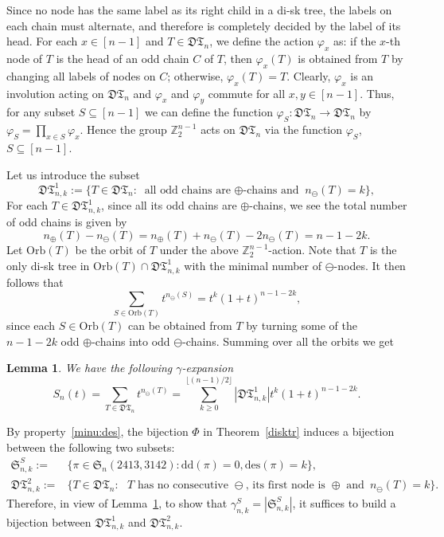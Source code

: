 \documentclass[12pt]{amsart}
\numberwithin{equation}{section}
\theoremstyle{plain}
\newtheorem{lemma}[theorem]{Lemma}
\theoremstyle{definition}
\newcommand{\Z}{\mathbb{Z}}
\def\dd{\mathrm{dd}}
\def\des{\mathrm{des}}
\def\S{\mathfrak{S}}
\def\D{\mathfrak{D}}
\def\T{\mathfrak{T}}
\def\Orb{\mathrm{Orb}}
\begin{document}
Since no node has the same label as its right child in a di-sk tree, the labels on each chain must alternate, and therefore is completely decided by the label of its head. For each $x\in[n-1]$ and $T\in\D\T_n$, we define the action $\varphi_x$ as: if the $x$-th node of $T$ is the head of an odd chain $C$ of $T$, then   $\varphi_x(T)$ is obtained from $T$ by changing all labels of nodes on $C$; otherwise, $\varphi_x(T)=T$. Clearly, $\varphi_x$ is an involution acting on $\D\T_n$ and $\varphi_x$ and $\varphi_y$ commute for all $x,y\in[n-1]$. Thus, for any subset $S\subseteq[n-1]$ we can define the function $\varphi_S:\D\T_n\rightarrow\D\T_n$ by $\varphi_S=\prod_{x\in S}\varphi_x$.  Hence the group $\Z_2^{n-1}$ acts on $\D\T_n$ via the function $\varphi_S$, $S\subseteq[n-1]$. 

Let us introduce the subset 
$$
\D\T_{n,k}^{1}:=\{T\in\D\T_n :  \text{ all odd chains are $\oplus$-chains and }n_\ominus(T)=k\},
$$
For each $T\in\D\T_{n,k}^{1}$, since all its odd chains are $\oplus$-chains, we see the total number of odd chains is given by
$$n_\oplus(T)-n_\ominus(T)=n_\oplus(T)+n_\ominus(T)-2n_\ominus(T)=n-1-2k.$$ 
Let $\Orb(T)$ be the orbit of $T$ under the above $\Z_2^{n-1}$-action. Note that $T$ is the only di-sk tree in $\Orb(T)\cap\D\T_{n,k}^{1}$ with the minimal number of $\ominus$-nodes. It then follows that 
$$
\sum_{S\in\Orb(T)}t^{n_\ominus(S)}=t^k(1+t)^{n-1-2k},
$$
since each $S\in\Orb(T)$ can be obtained from $T$ by turning some of the  $n-1-2k$  odd $\oplus$-chains into odd $\ominus$-chains. Summing over all the orbits we get

\begin{lemma}\label{int:1}
We have the following $\gamma$-expansion
$$
S_n(t)=\sum_{T\in \D\T_n} t^{n_\ominus(T)}=\sum_{k\geq 0}^{\lfloor(n-1)/2\rfloor}|\D\T_{n,k}^1| t^k (1+t)^{n-1-2k}.
$$
\end{lemma}

By property~\eqref{minu:des}, the bijection $\Phi$ in Theorem~\ref{disktr}  induces a bijection between the following two subsets:
\begin{align*}
\S_{n,k}^S:= & \{\pi \in \S_n(2413,3142) : \dd(\pi)=0, \des(\pi)=k\},\\
\D\T_{n,k}^{2}:= &\{T\in\D\T_n : \text{ $T$ has no consecutive $\ominus$, its first node is $\oplus$ and}\,\,\, n_\ominus(T)=k\}.
\end{align*}
Therefore, in view of Lemma~\ref{int:1}, to show that $\gamma^S_{n,k}=|\S_{n,k}^S|$, it  suffices to build a bijection between $\D\T_{n,k}^{1}$ and $\D\T_{n,k}^{2}$. 
\end{document}
